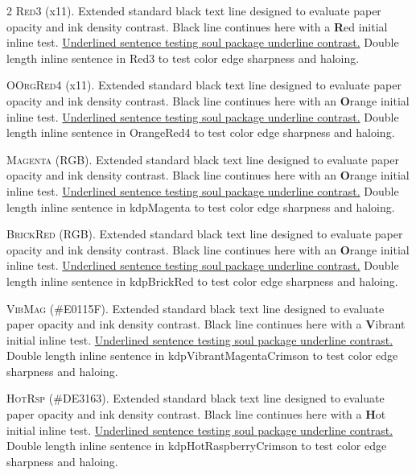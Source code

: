 \begin{multicols}{2}
\lettrine[lines=2]{\textcolor{Red3}{R}}{ed3} (x11). Extended standard black text line designed to evaluate paper opacity and ink density contrast. Black line continues here with a \textbf{\textcolor{Red3}{R}}ed initial inline test. \ul{Underlined sentence testing soul package underline contrast.} \textcolor{Red3}{Double length inline sentence in Red3 to test color edge sharpness and haloing.}


\lettrine[lines=2]{\textcolor{OrangeRed4}{O}}{OrgRed4} (x11). Extended standard black text line designed to evaluate paper opacity and ink density contrast. Black line continues here with an \textbf{\textcolor{OrangeRed4}{O}}range initial inline test. \ul{Underlined sentence testing soul package underline contrast.} \textcolor{OrangeRed4}{Double length inline sentence in OrangeRed4 to test color edge sharpness and haloing.}


\lettrine[lines=2]{\textcolor{kdpMagenta}{M}}{agenta} (RGB). Extended standard black text line designed to evaluate paper opacity and ink density contrast. Black line continues here with an \textbf{\textcolor{kdpMagenta}{O}}range initial inline test. \ul{Underlined sentence testing soul package underline contrast.} \textcolor{kdpMagenta}{Double length inline sentence in kdpMagenta to test color edge sharpness and haloing.}


\lettrine[lines=2]{\textcolor{kdpBrickRed}{B}}{rickRed} (RGB). Extended standard black text line designed to evaluate paper opacity and ink density contrast. Black line continues here with an \textbf{\textcolor{kdpBrickRed}{O}}range initial inline test. \ul{Underlined sentence testing soul package underline contrast.} \textcolor{kdpBrickRed}{Double length inline sentence in kdpBrickRed to test color edge sharpness and haloing.}


\lettrine[lines=2]{\textcolor{kdpVibrantMagentaCrimson}{V}}{ibMag} (\#E0115F). Extended standard black text line designed to evaluate paper opacity and ink density contrast. Black line continues here with a \textbf{\textcolor{kdpVibrantMagentaCrimson}{V}}ibrant initial inline test. \ul{Underlined sentence testing soul package underline contrast.} \textcolor{kdpVibrantMagentaCrimson}{Double length inline sentence in kdpVibrantMagentaCrimson to test color edge sharpness and haloing.}


\lettrine[lines=2]{\textcolor{kdpHotRaspberryCrimson}{H}}{otRsp} (\#DE3163). Extended standard black text line designed to evaluate paper opacity and ink density contrast. Black line continues here with a \textbf{\textcolor{kdpHotRaspberryCrimson}{H}}ot initial inline test. \ul{Underlined sentence testing soul package underline contrast.} \textcolor{kdpHotRaspberryCrimson}{Double length inline sentence in kdpHotRaspberryCrimson to test color edge sharpness and haloing.}



\end{multicols}
